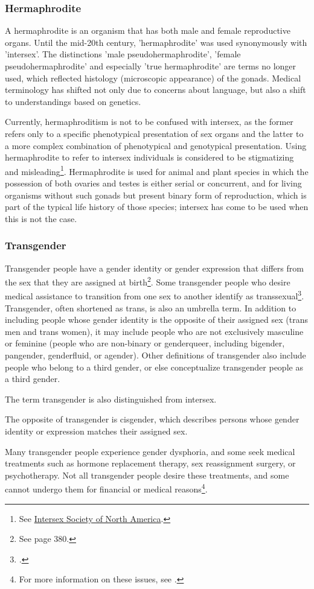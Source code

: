 \subsubsection{Hermaphrodite}
\label{hermaphrodite}
A hermaphrodite is an organism that has both male and female reproductive organs. Until the mid-20th century, 'hermaphrodite' was used synonymously with 'intersex'. The distinctions 'male pseudohermaphrodite', 'female pseudohermaphrodite' and especially 'true hermaphrodite' are terms no longer used, which reflected histology (microscopic appearance) of the gonads. Medical terminology has shifted not only due to concerns about language, but also a shift to understandings based on genetics.

Currently, hermaphroditism is not to be confused with intersex, as the former refers only to a specific phenotypical presentation of sex organs and the latter to a more complex combination of phenotypical and genotypical presentation. Using hermaphrodite to refer to intersex individuals is considered to be stigmatizing and misleading\footnote{See \href{https://web.archive.org/web/20130701061246/http://www.isna.org/faq/hermaphrodite}{Intersex Society of North America}.}. Hermaphrodite is used for animal and plant species in which the possession of both ovaries and testes is either serial or concurrent, and for living organisms without such gonads but present binary form of reproduction, which is part of the typical life history of those species; intersex has come to be used when this is not the case.

\subsubsection{Transgender}
Transgender people have a gender identity or gender expression that differs from the sex that they are assigned at birth\footnote{See \cite{altilio} page 380.}. Some transgender people who desire medical assistance to transition from one sex to another identify as transsexual\footnote{\cite{polly}.}. Transgender, often shortened as trans, is also an umbrella term. In addition to including people whose gender identity is the opposite of their assigned sex (trans men and trans women), it may include people who are not exclusively masculine or feminine (people who are non-binary or genderqueer, including bigender, pangender, genderfluid, or agender). Other definitions of transgender also include people who belong to a third gender, or else conceptualize transgender people as a third gender.

The term transgender is also distinguished from intersex. 

The opposite of transgender is cisgender, which describes persons whose gender identity or expression matches their assigned sex.

Many transgender people experience gender dysphoria, and some seek medical treatments such as hormone replacement therapy, sex reassignment surgery, or psychotherapy. Not all transgender people desire these treatments, and some cannot undergo them for financial or medical reasons\footnote{For more information on these issues, see \cite{maizes}.}.
